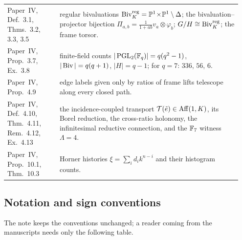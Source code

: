 {\begin{longtable}{@{}p{0.215\linewidth}p{0.735\linewidth}@{}}
Paper~IV, Def.~3.1, Thms.~3.2, 3.3, 3.5 & regular bivaluations
$\operatorname{Biv}_K^{\mathrm{reg}}=\mathbb{P}^1\!\times\!\mathbb{P}^1\setminus\Delta$; the
bivaluation--projector bijection $\Pi_{a,b}=\frac1{1+ab}v_a\otimes\varphi_b$;
$G/H\cong\operatorname{Biv}_K^{\mathrm{reg}}$; the frame torsor. \\
Paper~IV, Prop.~3.7, Ex.~3.8 & finite-field counts
$|\operatorname{PGL}_2(\mathbb{F}_q)|=q(q^2-1)$, $|\operatorname{Biv}|=q(q+1)$, $|H|=q-1$; for $q=7$:
$336$, $56$, $6$. \\
Paper~IV, Prop.~4.9 & edge labels given only by ratios of frame lifts telescope
along every closed path. \\
Paper~IV, Def.~4.10, Thm.~4.11, Rem.~4.12, Ex.~4.13 & the incidence-coupled
transport $\mathcal T(\tilde e)\in\operatorname{Aff}(1,K)$, its Borel reduction, the
cross-ratio holonomy, the infinitesimal reductive connection, and the
$\mathbb{F}_7$ witness $\Lambda=4$. \\
Paper~IV, Prop.~10.1, Thm.~10.3 & Horner histories
$\xi=\sum_i d_i k^{n-i}$ and their histogram counts. \\
\end{longtable}}

\subsection{Notation and sign conventions}

The note keeps the \AEG{} conventions unchanged; a reader coming from the
manuscripts needs only the following table.


